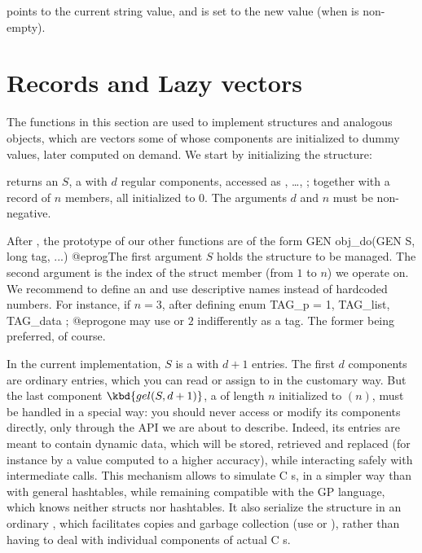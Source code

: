 \item {} points to the current string value, and is set to the new
value (when  is non-empty).

\section{Records and Lazy vectors}
The functions in this section are used to implement  structures and
analogous objects, which are vectors some of whose components are initialized
to dummy values, later computed on demand. We start by initializing the
structure:

 returns an  $S$, a 
with $d$ regular components, accessed as , \dots,
; together with a record of $n$ members, all initialized to
$0$. The arguments $d$ and $n$ must be non-negative.

After , the prototype of our other functions are of
the form
\bprog
  GEN obj_do(GEN S, long tag, ...)
@eprog\noindent The first argument $S$ holds the structure to be managed.
The second argument  is the index of the struct member (from $1$ to
$n$) we operate on. We recommend to define an  and use descriptive
names instead of hardcoded numbers. For instance, if $n = 3$, after defining
\bprog
  enum { TAG_p = 1, TAG_list, TAG_data };
@eprog\noindent one may use  or $2$ indifferently as a tag.
The former being preferred, of course.

In the current implementation, $S$ is a  with $d+1$ entries.
The first $d$ components are ordinary  entries, which you can
read or assign to in the customary way. But the last component $\kbd{gel(S,
d+1)}$, a  of length $n$ initialized to $(n)$, must
be handled in a special way: you should never access or modify its components
directly, only through the API we are about to describe. Indeed, its entries
are meant to contain dynamic data, which will be stored, retrieved and
replaced (for instance by a value computed to a higher accuracy), while
interacting safely with intermediate  calls. This mechanism
allows to simulate C s, in a simpler way than with general
hashtables, while remaining compatible with the GP language, which knows
neither structs nor hashtables. It also serialize the structure in an
ordinary , which facilitates copies and garbage collection (use
 or ), rather than having to deal with individual
components of actual C s.

